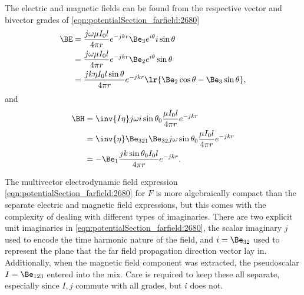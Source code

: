 {The electric and magnetic fields can be found from the respective vector and bivector grades of \cref{eqn:potentialSection_farfield:2680}
\begin{equation}\label{eqn:potentialSection_farfield:2700}
\begin{aligned}
\BE
&= \frac{j \omega \mu I_0 l}{4 \pi r} e^{-j k r} \Be_3 e^{i\theta} i \sin\theta \\
&= \frac{j \omega \mu I_0 l}{4 \pi r} e^{-j k r} \Be_2 e^{i\theta} \sin\theta \\
&= \frac{j k \eta I_0 l \sin\theta}{4 \pi r} e^{-j k r} \lr{ \Be_2 \cos\theta - \Be_3 \sin\theta },
\end{aligned}
\end{equation}
and
\begin{equation}\label{eqn:potentialSection_farfield:2720}
\begin{aligned}
\BH
&= \inv{I \eta} j \omega i \sin\theta_0 \frac{\mu I_0 l}{4 \pi r} e^{-j k r} \\
&= \inv{\eta} \Be_{321} \Be_{32} j \omega \sin\theta_0 \frac{\mu I_0 l}{4 \pi r} e^{-j k r} \\
&= -\Be_1 \frac{ j k \sin\theta_0 I_0 l}{4 \pi r} e^{-j k r}.
\end{aligned}
\end{equation}

The multivector electrodynamic field expression
\cref{eqn:potentialSection_farfield:2680} for
\( F \) is more algebraically compact than the separate electric and magnetic field expressions, but this comes with the complexity of dealing with different types of imaginaries.
There are two explicit unit imaginaries in \cref{eqn:potentialSection_farfield:2680}, the scalar imaginary \( j \) used to encode the time harmonic nature of the field, and \( i = \Be_{32} \) used to represent the plane that the far field propagation direction vector lay in.
Additionally, when the magnetic field component was extracted, the pseudoscalar \( I = \Be_{123} \) entered into the mix.
Care is required to keep these all separate, especially since \( I, j \) commute with all grades, but \( i \) does not.
} %

